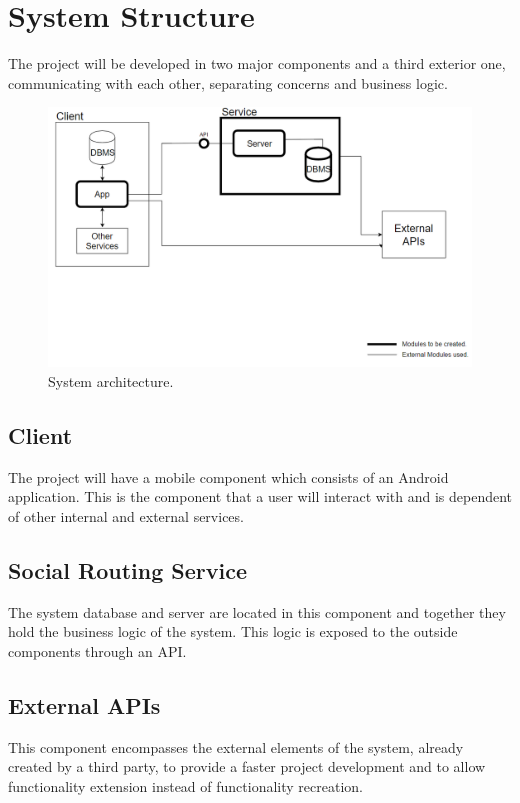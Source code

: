 \documentclass{article}
\begin{document}
    \section{System Structure}
        The project will be developed in two major components and a third exterior one, communicating with each other, separating concerns and business logic.
        
        \begin{figure}[h]            
            \includegraphics[width=\textwidth]{images/project-structure/system-structure.PNG}
            \caption{System architecture.}
        \end{figure}  

        \subsection{Client}  
            The project will have a mobile component which consists of an Android application. 
            This is the component that a user will interact with and is dependent of other internal and external services.
        \subsection{Social Routing Service}
            The system database and server are located in this component and together they hold the business logic of the system.
            This logic is exposed to the outside components through an API.
        \subsection{External APIs}
            This component encompasses the external elements of the system, already created by a third party, to provide a faster project development
            and to allow functionality extension instead of functionality recreation. 
    
\end{document}
